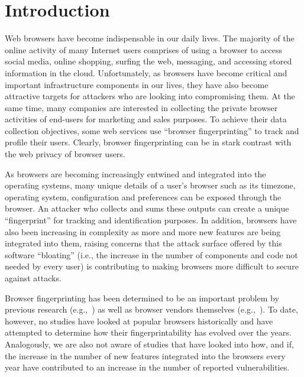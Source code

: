 \section{Introduction}
\label{sec:introduction}

Web browsers have become indispensable in our daily lives. The
majority of the online activity of many Internet users comprises of
using a browser to access social media, online shopping, surfing the
web, messaging, and accessing stored information in the cloud.
Unfortunately, as browsers have become critical and important
infrastructure components in our lives, they have also become
attractive targets for attackers who are looking into compromising
them. At the same time, many companies are interested in collecting
the private browser activities of end-users for marketing and sales
purposes. To achieve their data collection objectives, some web
services use ``browser fingerprinting'' to track and profile their
users. Clearly, browser fingerprinting can be in stark contrast with
the web privacy of browser users.

As browsers are becoming increasingly entwined and integrated into the
operating systems, many unique details of a user's browser such as its
timezone, operating system, configuration and preferences can be
exposed through the browser. An attacker who collects and sums these
outputs can create a unique ``fingerprint'' for tracking and
identification purposes. In addition, browsers have also been
increasing in complexity as more and more new features are being
integrated into them, raising concerns that the attack surface offered
by this software ``bloating'' (i.e., the increase in the number of
components and code not needed by every user) is contributing to
making browsers more difficult to secure against attacks.

Browser fingerprinting has been determined to be an important problem
by previous research (e.g.,~\cite{}) as well as browser vendors
themselves (e.g.,~\cite{}). To date, however, no studies have looked
at popular browsers historically and have attempted to determine how
their fingerprintability has evolved over the years. Analogously, we
are also not aware of studies that have looked into how, and if, the
increase in the number of new features integrated into the browsers
every year have contributed to an increase in the number of reported
vulnerabilities.

